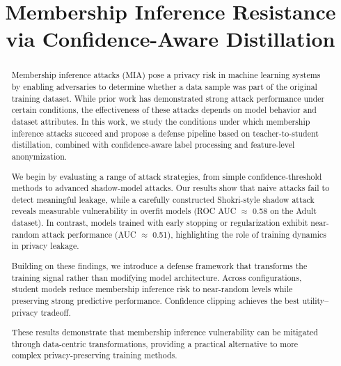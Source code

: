 \documentclass[conference]{IEEEtran}
\title{Membership Inference Resistance via Confidence-Aware Distillation}
\author{
\IEEEauthorblockN{Joseph D. Janicki}
\IEEEauthorblockA{
University of Mississippi \\
joseph.d.janicki@gmail.com
}
}
\begin{document}
\maketitle

\begin{abstract}
Membership inference attacks (MIA) pose a privacy risk in machine learning systems by enabling adversaries to determine whether a data sample was part of the original training dataset. While prior work has demonstrated strong attack performance under certain conditions, the effectiveness of these attacks depends on model behavior and dataset attributes. In this work, we study the conditions under which membership inference attacks succeed and propose a defense pipeline based on teacher-to-student distillation, combined with confidence-aware label processing and feature-level anonymization.

We begin by evaluating a range of attack strategies, from simple confidence-threshold methods to advanced shadow-model attacks. Our results show that naive attacks fail to detect meaningful leakage, while a carefully constructed Shokri-style shadow attack reveals measurable vulnerability in overfit models (ROC AUC $\approx$ 0.58 on the Adult dataset). In contrast, models trained with early stopping or regularization exhibit near-random attack performance (AUC $\approx$ 0.51), highlighting the role of training dynamics in privacy leakage.

Building on these findings, we introduce a defense framework that transforms the training signal rather than modifying model architecture. Across configurations, student models reduce membership inference risk to near-random levels while preserving strong predictive performance. Confidence clipping achieves the best utility--privacy tradeoff.

These results demonstrate that membership inference vulnerability can be mitigated through data-centric transformations, providing a practical alternative to more complex privacy-preserving training methods.
\end{abstract}
\end{document}
